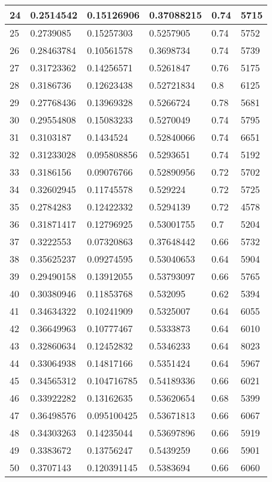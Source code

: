 \begin{longtable}{|l|l|l|l|l|l|}
24 & 0.2514542 & 0.15126906 & 0.37088215 & 0.74 & 5715 \\ \hline 
25 & 0.2739085 & 0.15257303 & 0.5257905 & 0.74 & 5752 \\ \hline 
26 & 0.28463784 & 0.10561578 & 0.3698734 & 0.74 & 5739 \\ \hline 
27 & 0.31723362 & 0.14256571 & 0.5261847 & 0.76 & 5175 \\ \hline 
28 & 0.3186736 & 0.12623438 & 0.52721834 & 0.8 & 6125 \\ \hline 
29 & 0.27768436 & 0.13969328 & 0.5266724 & 0.78 & 5681 \\ \hline 
30 & 0.29554808 & 0.15083233 & 0.5270049 & 0.74 & 5795 \\ \hline 
31 & 0.3103187 & 0.1434524 & 0.52840066 & 0.74 & 6651 \\ \hline 
32 & 0.31233028 & 0.095808856 & 0.5293651 & 0.74 & 5192 \\ \hline 
33 & 0.3186156 & 0.09076766 & 0.52890956 & 0.72 & 5702 \\ \hline 
34 & 0.32602945 & 0.11745578 & 0.529224 & 0.72 & 5725 \\ \hline 
35 & 0.2784283 & 0.12422332 & 0.5294139 & 0.72 & 4578 \\ \hline 
36 & 0.31871417 & 0.12796925 & 0.53001755 & 0.7 & 5204 \\ \hline 
37 & 0.3222553 & 0.07320863 & 0.37648442 & 0.66 & 5732 \\ \hline 
38 & 0.35625237 & 0.09274595 & 0.53040653 & 0.64 & 5904 \\ \hline 
39 & 0.29490158 & 0.13912055 & 0.53793097 & 0.66 & 5765 \\ \hline 
40 & 0.30380946 & 0.11853768 & 0.532095 & 0.62 & 5394 \\ \hline 
41 & 0.34634322 & 0.10241909 & 0.5325007 & 0.64 & 6055 \\ \hline 
42 & 0.36649963 & 0.10777467 & 0.5333873 & 0.64 & 6010 \\ \hline 
43 & 0.32860634 & 0.12452832 & 0.5346233 & 0.64 & 8023 \\ \hline 
44 & 0.33064938 & 0.14817166 & 0.5351424 & 0.64 & 5967 \\ \hline 
45 & 0.34565312 & 0.104716785 & 0.54189336 & 0.66 & 6021 \\ \hline 
46 & 0.33922282 & 0.13162635 & 0.53620654 & 0.68 & 5399 \\ \hline 
47 & 0.36498576 & 0.095100425 & 0.53671813 & 0.66 & 6067 \\ \hline 
48 & 0.34303263 & 0.14235044 & 0.53697896 & 0.66 & 5919 \\ \hline 
49 & 0.3383672 & 0.13756247 & 0.5439259 & 0.66 & 5901 \\ \hline 
50 & 0.3707143 & 0.120391145 & 0.5383694 & 0.66 & 6060 \\ \hline 
\end{longtable}